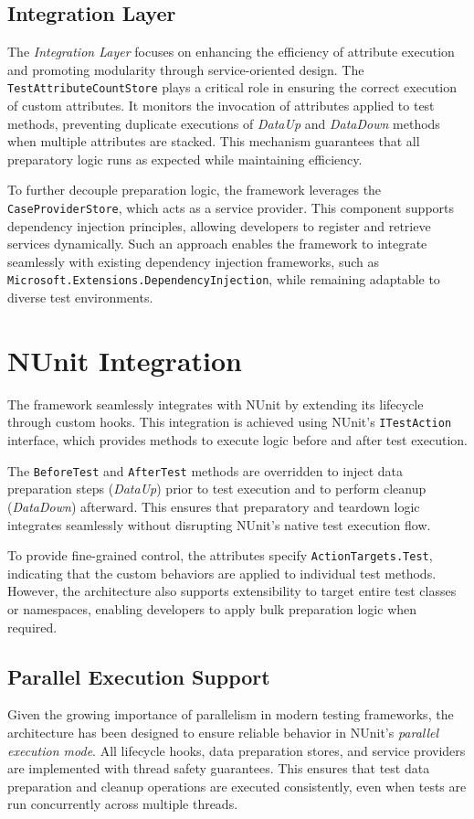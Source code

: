 \subsection{Integration Layer}
The \textit{Integration Layer} focuses on enhancing the efficiency of attribute execution and promoting modularity through service-oriented design.
The \texttt{TestAttributeCountStore} plays a critical role in ensuring the correct execution of custom attributes. It monitors the invocation of attributes applied to test methods, preventing duplicate executions of \textit{DataUp} and \textit{DataDown} methods when multiple attributes are stacked. This mechanism guarantees that all preparatory logic runs as expected while maintaining efficiency.

To further decouple preparation logic, the framework leverages the \texttt{CaseProviderStore}, which acts as a service provider. This component supports dependency injection principles, allowing developers to register and retrieve services dynamically. Such an approach enables the framework to integrate seamlessly with existing dependency injection frameworks, such as \texttt{Microsoft.Extensions.DependencyInjection}, while remaining adaptable to diverse test environments.

\section{NUnit Integration}
The framework seamlessly integrates with NUnit by extending its lifecycle through custom hooks. This integration is achieved using NUnit's \texttt{ITestAction} interface, which provides methods to execute logic before and after test execution.

The \texttt{BeforeTest} and \texttt{AfterTest} methods are overridden to inject data preparation steps (\textit{DataUp}) prior to test execution and to perform cleanup (\textit{DataDown}) afterward. This ensures that preparatory and teardown logic integrates seamlessly without disrupting NUnit’s native test execution flow.

To provide fine-grained control, the attributes specify \texttt{ActionTargets.Test}, indicating that the custom behaviors are applied to individual test methods. However, the architecture also supports extensibility to target entire test classes or namespaces, enabling developers to apply bulk preparation logic when required.

\subsection{Parallel Execution Support}
Given the growing importance of parallelism in modern testing frameworks, the architecture has been designed to ensure reliable behavior in NUnit's \textit{parallel execution mode}. All lifecycle hooks, data preparation stores, and service providers are implemented with thread safety guarantees. This ensures that test data preparation and cleanup operations are executed consistently, even when tests are run concurrently across multiple threads.

